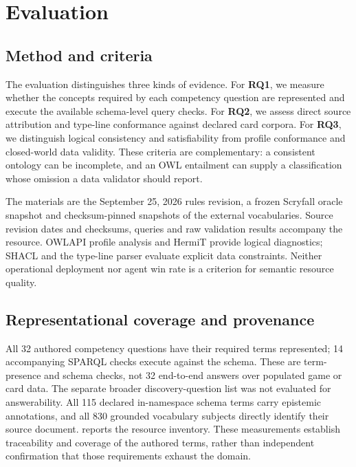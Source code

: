\documentclass[11pt,a4paper]{article}
\begin{document}
\section{Evaluation}
\label{sec:validation}

\subsection{Method and criteria}

The evaluation distinguishes three kinds of evidence. For \textbf{RQ1}, we measure whether the concepts required by each competency question are represented and execute the available schema-level query checks. For \textbf{RQ2}, we assess direct source attribution and type-line conformance against declared card corpora. For \textbf{RQ3}, we distinguish logical consistency and satisfiability from profile conformance and closed-world data validity. These criteria are complementary: a consistent ontology can be incomplete, and an OWL entailment can supply a classification whose omission a data validator should report.

The materials are the September 25, 2026 rules revision, a frozen Scryfall oracle snapshot and checksum-pinned snapshots of the external vocabularies. Source revision dates and checksums, queries and raw validation results accompany the resource. OWLAPI profile analysis and HermiT provide logical diagnostics; SHACL \citep{w3c2017shacl} and the type-line parser evaluate explicit data constraints. Neither operational deployment nor agent win rate is a criterion for semantic resource quality.

\subsection{Representational coverage and provenance}

All 32 authored competency questions have their required terms represented; 14 accompanying SPARQL checks execute against the schema. These are term-presence and schema checks, not 32 end-to-end answers over populated game or card data. The separate broader discovery-question list was not evaluated for answerability. All 115 declared in-namespace schema terms carry epistemic annotations, and all 830 grounded vocabulary subjects directly identify their source document.  reports the resource inventory. These measurements establish traceability and coverage of the authored terms, rather than independent confirmation that those requirements exhaust the domain.
\end{document}
